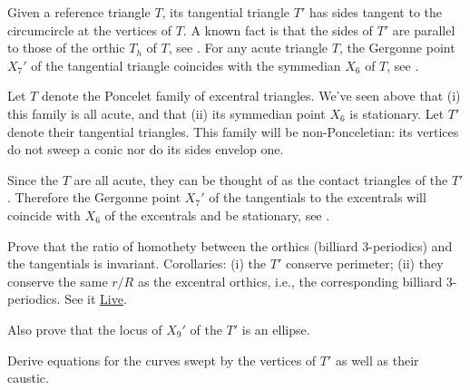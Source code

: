 \begin{exercise}
Given a reference triangle $T$, its tangential triangle $T'$ has sides tangent to the circumcircle at the vertices of $T$. A known fact is that the sides of $T'$ are parallel to those of the orthic $T_h$ of $T$, see \cite[Tangential Triangle]{mw}. For any acute triangle $T$, the Gergonne point $X_7'$ of the tangential triangle coincides with the symmedian $X_6$ of $T$, see \cite[Contact Triangle]{mw}.

Let $T$ denote the Poncelet family of excentral triangles. We've seen above that (i) this family is all acute, and that (ii) its symmedian point $X_6$ is stationary. Let $T'$ denote their tangential triangles. This family will be non-Ponceletian: its vertices do not sweep a conic nor do its sides envelop one.

Since the $T$ are all acute, they can be thought of as the contact triangles of the $T'$. Therefore the Gergonne point $X_7'$ of the tangentials to the excentrals will coincide with $X_6$ of the excentrals and be stationary, see \cite[Contact Triangle]{mw}.

Prove that the ratio of homothety between the orthics (billiard 3-periodics) and the tangentials is invariant. Corollaries: (i) the $T'$ conserve perimeter; (ii) they conserve the same $r/R$ as the excentral orthics, i.e., the corresponding billiard 3-periodics. See it \href{https://bit.ly/3o7JM8V}{Live}.

Also prove that the locus of $X_9'$ of the $T'$ is an ellipse.

Derive equations for the curves swept by the vertices of $T'$ as well as their caustic. 
\end{exercise}
